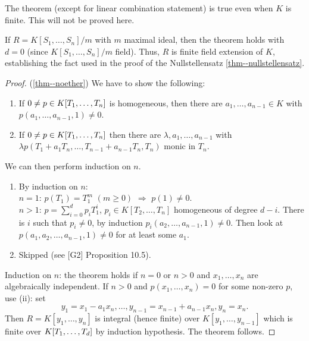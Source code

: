 \documentclass[a4paper,11pt]{article}
\begin{document}
			\begin{remark}
				The theorem (except for linear combination statement) is true even when $K$ is finite. This will not be proved here. 
			\end{remark}

			\begin{cor}
				If $R=K[S_1,\dots,S_n]/m$ with $m$ maximal ideal, then the theorem holds with $d=0$ (since $K[S_1,\dots,S_n]/m$ field). Thus, $R$ is finite field extension of $K$, establishing the fact used in the proof of the Nullstellensatz \autoref{thm--nullstellensatz}.
			\end{cor}

			\begin{proof}
				(\autoref{thm--noether}) We have to show the following:
				\begin{enumerate}
					\item If $0\neq p\in K[T_1,\dots,T_{n}]$ is homogeneous, then there are $a_1,\dots,a_{n-1}\in K$ with $p(a_1,\dots,a_{n-1},1)\neq0$.
					\item If $0\neq p\in K[T_1,\dots,T_{n}]$ then there are $\lambda,a_1,\dots,a_{n-1}$ with $\lambda p(T_1+a_1 T_n,\dots,T_{n-1}+a_{n-1}T_n,T_n)$ monic in $T_n$.
				\end{enumerate}
				We can then perform induction on $n$.
				\begin{enumerate}
					\item By induction on $n$:\\
						$n=1$: $p(T_1)=T_1^m$ $(m\ge0)$ $\Longrightarrow$ $p(1)\neq0$.\\
						$n>1$: $p=\sum_{i=0}^{d}p_iT_1^i$, $p_i\in K[T_2,\dots,T_n]$ homogeneous of degree $d-i$. There is $i$ such that $p_i\neq0$, by induction $p_i(a_2,\dots,a_{n-1},1)\neq0$. Then look at $p(a_1,a_2,\dots,a_{n-1},1)\neq0$ for at least some $a_1$.
					\item Skipped (see [G2] Proposition 10.5).
				\end{enumerate}
				Induction on $n$: the theorem holds if $n=0$ or $n>0$ and $x_1,\dots,x_n$ are algebraically independent. If $n>0$ and $p(x_1,\dots,x_n)=0$ for some non-zero $p$, use (ii): set 
				\begin{equation*}
					y_1=x_1-a_1 x_n,\dots,y_{n-1}=x_{n-1}+a_{n-1}x_n,y_n=x_n.
				\end{equation*}
				Then $R=K[y_1,\dots,y_n]$ is integral (hence finite) over $K[y_1,\dots,y_{n-1}]$ which is finite over $K[T_1,\dots,T_{d}]$ by induction hypothesis. The theorem follows.
			\end{proof}
\end{document}
